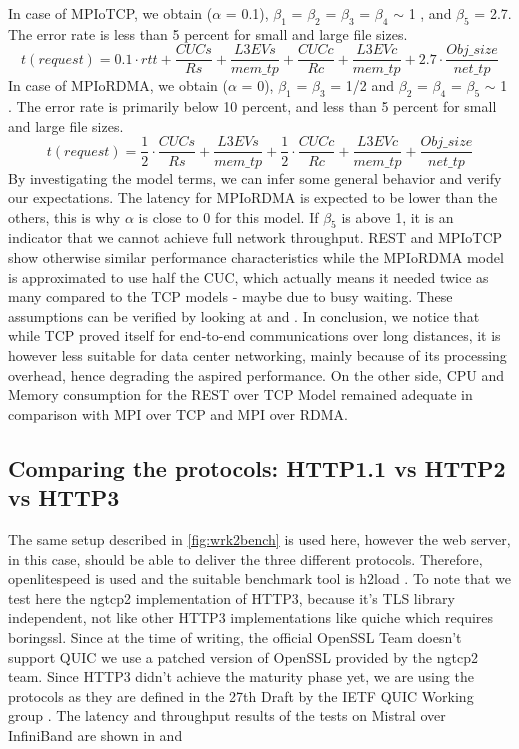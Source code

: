 \documentclass[runningheads]{llncs}
\begin{document}
In case of MPIoTCP, we obtain ($\alpha$ = 0.1), $\beta_1$ = $\beta_2$ = $\beta_3$ = $\beta_4$ $\sim$ 1 , and $\beta_5$ = 2.7. The error rate is less than 5 percent for small and large file sizes.
\begin{equation}
\label{eq:model-rest}
t(request)=0.1\cdot rtt+\frac{CUCs}{Rs}+\frac{L3EVs}{mem\_tp}+\frac{CUCc}{Rc}+\frac{L3EVc}{mem\_tp}+2.7\cdot\frac{Obj\_size}{net\_tp}
\end{equation}
In case of MPIoRDMA, we obtain ($\alpha$ = 0), $\beta_1$ = $\beta_3$ = 1/2 and  $\beta_2$ = $\beta_4$ = $\beta_5$ $\sim$ 1 . The error rate is primarily below 10 percent, and less than 5 percent for small and large file sizes.
\begin{equation}
\label{eq:model-rest}
t(request)=\frac{1}{2}\cdot\frac{CUCs}{Rs}+\frac{L3EVs}{mem\_tp}+\frac{1}{2}\cdot\frac{CUCc}{Rc}+\frac{L3EVc}{mem\_tp}+\frac{Obj\_size}{net\_tp}
\end{equation}
By investigating the model terms, we can infer some general behavior and verify our expectations. The latency for MPIoRDMA is expected to be lower than the others, this  is why $\alpha$ is close to 0 for this model. If $\beta_5$ is above 1, it is an indicator that we cannot achieve full network throughput. REST and MPIoTCP show otherwise similar performance characteristics while the MPIoRDMA model is approximated to use half the CUC, which actually means it needed twice as many compared to the TCP models - maybe due to busy waiting. These assumptions can be verified by looking at  and .
In conclusion, we notice that while TCP proved itself for end-to-end communications over long distances, it is however less suitable for data center networking, mainly because of its processing overhead, hence degrading the aspired performance. On the other side, CPU and Memory consumption for the REST over TCP Model remained adequate in comparison with MPI over TCP and MPI over RDMA.


\subsection{Comparing the protocols: HTTP1.1 vs HTTP2 vs HTTP3}
The same setup described in \cref{fig:wrk2bench} is used here, however the web server, in this case, should be able to deliver the three different protocols. Therefore, openlitespeed \cite{openlitespeed} is used and the suitable benchmark tool is h2load \cite{h2load}.
To note that we test here the ngtcp2 \cite{ngtcp2} implementation of HTTP3, because it's TLS library independent, not like other HTTP3 implementations like quiche \cite{quiche} which requires boringssl. Since at the time of writing, the official OpenSSL Team doesn’t support QUIC \cite{opensslquicblog} we use a patched version of OpenSSL provided by the ngtcp2 team.
Since HTTP3 didn't achieve the maturity phase yet, we are using the protocols as they are defined in the 27th Draft by the IETF QUIC Working group \cite{quicwg}.
The latency and throughput results of the tests on Mistral over InfiniBand are shown in  and 
\end{document}
